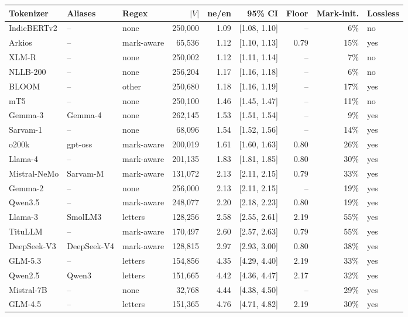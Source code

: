 \begin{table}[t]
\centering\small
\setlength{\tabcolsep}{4pt}
\begin{tabular}{lllrrrrrl}
\toprule
Tokenizer & Aliases & Regex & $|V|$ & ne/en & 95\% CI & Floor & Mark-init. & Lossless \\
\midrule
IndicBERTv2 & -- & none & 250,000 & 1.09 & [1.08, 1.10] & -- & 6\% & no \\
Arkios & -- & mark-aware & 65,536 & 1.12 & [1.10, 1.13] & 0.79 & 15\% & yes \\
XLM-R & -- & none & 250,002 & 1.12 & [1.11, 1.14] & -- & 7\% & no \\
NLLB-200 & -- & none & 256,204 & 1.17 & [1.16, 1.18] & -- & 6\% & no \\
BLOOM & -- & other & 250,680 & 1.18 & [1.16, 1.19] & -- & 17\% & yes \\
mT5 & -- & none & 250,100 & 1.46 & [1.45, 1.47] & -- & 11\% & no \\
Gemma-3 & Gemma-4 & none & 262,145 & 1.53 & [1.51, 1.54] & -- & 9\% & yes \\
Sarvam-1 & -- & none & 68,096 & 1.54 & [1.52, 1.56] & -- & 14\% & yes \\
o200k & gpt-oss & mark-aware & 200,019 & 1.61 & [1.60, 1.63] & 0.80 & 26\% & yes \\
Llama-4 & -- & mark-aware & 201,135 & 1.83 & [1.81, 1.85] & 0.80 & 30\% & yes \\
Mistral-NeMo & Sarvam-M & mark-aware & 131,072 & 2.13 & [2.11, 2.15] & 0.79 & 33\% & yes \\
Gemma-2 & -- & none & 256,000 & 2.13 & [2.11, 2.15] & -- & 19\% & yes \\
Qwen3.5 & -- & mark-aware & 248,077 & 2.20 & [2.18, 2.23] & 0.80 & 19\% & yes \\
Llama-3 & SmolLM3 & letters & 128,256 & 2.58 & [2.55, 2.61] & 2.19 & 55\% & yes \\
TituLLM & -- & mark-aware & 170,497 & 2.60 & [2.57, 2.63] & 0.79 & 55\% & yes \\
DeepSeek-V3 & DeepSeek-V4 & mark-aware & 128,815 & 2.97 & [2.93, 3.00] & 0.80 & 38\% & yes \\
GLM-5.3 & -- & letters & 154,856 & 4.35 & [4.29, 4.40] & 2.19 & 33\% & yes \\
Qwen2.5 & Qwen3 & letters & 151,665 & 4.42 & [4.36, 4.47] & 2.17 & 32\% & yes \\
Mistral-7B & -- & none & 32,768 & 4.44 & [4.38, 4.50] & -- & 29\% & yes \\
GLM-4.5 & -- & letters & 151,365 & 4.76 & [4.71, 4.82] & 2.19 & 30\% & yes \\

\end{tabular}
\end{table}
